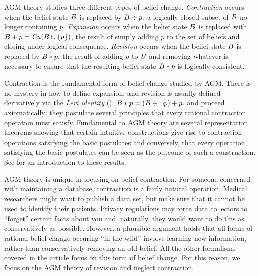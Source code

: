 AGM theory studies three different types of belief change. {\em Contraction}
occurs when the belief state $B$ is replaced by $B \div p$, a logically
closed subset of $B$ no longer containing $p$. {\em Expansion} occurs when
the belief state $B$ is replaced with $B+p = \text{\textit{Cn}}(B \cup \{p\})$, the
result of simply adding $p$ to the set of beliefs and closing under logical
consequence. {\em Revision} occurs when the belief state $B$ is replaced by
$B*p,$ the result of adding $p$ to $B$ and removing whatever is
necessary to ensure that the resulting belief state $B*p$ is logically
consistent.

Contraction is the fundamental form of belief change studied by AGM. There is no
mystery in how to define expansion, and revision is usually defined derivatively
via the {\em Levi identity} (): $B*p =
(B \div \neg p) + p$. \citet{alchourron1985logic} and \citet{
gardenfors1988revisions} proceed axiomatically: they postulate several
principles that every rational contraction operation must satisfy.  Fundamental
to AGM theory are several representation theorems showing that certain intuitive
constructions give rise to contraction operations satsifying the basic
postulates and conversely, that every operation satisfying the basic postulates
can be seen as the outcome of such a construction. See \citet{lin2019belief} for
an introduction to these results.  

AGM theory is unique in focusing on belief contraction. For someone concerned
with maintaining a database, contraction is a fairly natural operation. Medical
researchers might want to publish a data set, but make sure that it cannot be
used to identify their patients. Privacy regulations may force data collectors
to ``forget'' certain facts about you and, naturally, they would want to do this
as conservatively as possible.  However, a plausible argument holds that all
forms of rational belief change occuring ``in the wild'' involve learning new
information, rather than conservatively removing an old belief. All the other
formalisms covered in the article focus on this form of belief change. For this
reason, we focus on the AGM theory of revision and neglect contraction.

